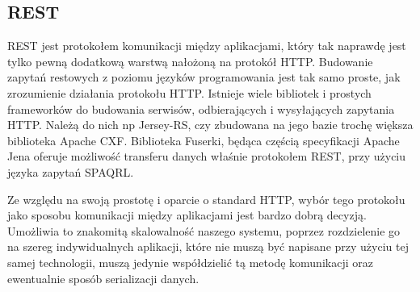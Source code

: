 \subsection{REST}
\label{sec:rest}

REST jest protokołem komunikacji między aplikacjami, który tak naprawdę jest tylko pewną dodatkową warstwą nałożoną na protokół HTTP. Budowanie zapytań restowych z poziomu języków programowania jest tak samo proste, jak zrozumienie działania protokołu HTTP. Istnieje wiele bibliotek i prostych frameworków do budowania serwisów, odbierających i wysyłających zapytania HTTP. Należą do nich np Jersey-RS, czy zbudowana na jego bazie trochę większa biblioteka Apache CXF. Biblioteka Fuserki, będąca częścią specyfikacji Apache Jena oferuje możliwość transferu danych właśnie protokołem REST, przy użyciu języka zapytań SPAQRL. 

Ze względu na swoją prostotę i oparcie o standard HTTP, wybór tego protokołu jako sposobu komunikacji między aplikacjami jest bardzo dobrą decyzją. Umożliwia to znakomitą skalowalność naszego systemu, poprzez rozdzielenie go na szereg indywidualnych aplikacji, które nie muszą być napisane przy użyciu tej samej technologii, muszą jedynie współdzielić tą metodę komunikacji oraz ewentualnie sposób serializacji danych.

